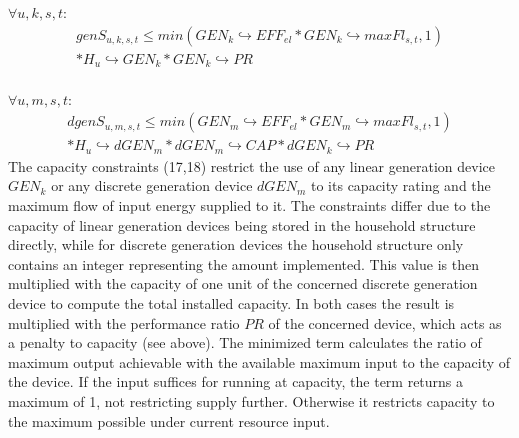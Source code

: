 \documentclass[
	11pt,								%
	DIV10,								%
	a4paper,         					%
	oneside,							%
	headheight=20pt,					%
	footheight=20pt,					%
    parskip=full,						%
    listof=totoc,						%
	bibliography=totoc,					%
	index=totoc,						%
]{scrartcl}
\begin{document}
	$\forall u,k,s,t$:
	\begin{equation}
		\begin{split}
		genS_{u,k,s,t} \leq min(GEN_k \hookrightarrow EFF_{el} * GEN_k \hookrightarrow maxFl_{s,t}, 1) \\ * H_u\hookrightarrow  GEN_k * GEN_k \hookrightarrow PR
		\end{split}
	\end{equation}
	\\
	$\forall u,m,s,t$:
	\begin{equation}
		\begin{split}
		dgenS_{u,m,s,t} \leq min(GEN_m \hookrightarrow EFF_{el} * GEN_m \hookrightarrow maxFl_{s,t}, 1) \\ * H_u\hookrightarrow  dGEN_m * dGEN_m \hookrightarrow CAP * dGEN_k \hookrightarrow PR
		\end{split}
	\end{equation}
	The capacity constraints (17,18) restrict the use of any linear generation device $GEN_k$ or any discrete generation device $dGEN_m$ to its capacity rating and the maximum flow of input energy supplied to it.
	The constraints differ due to the capacity of linear generation devices being stored in the household structure directly, while for discrete generation devices the household structure only contains an integer representing the amount implemented. This value is then multiplied with the capacity of one unit of the concerned discrete generation device to compute the total installed capacity. In both cases the result is multiplied with the performance ratio $PR$ of the concerned device, which acts as a penalty to capacity (see above). The minimized term calculates the ratio of maximum output achievable with the available maximum input to the capacity of the device. If the input suffices for running at capacity, the term returns a maximum of 1, not restricting supply further. Otherwise it restricts capacity to the maximum possible under current resource input.

	
\end{document}
